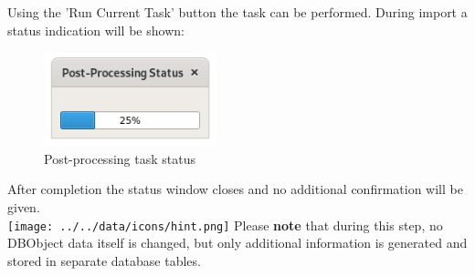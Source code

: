 Using the 'Run Current Task' button the task can be performed. During import a status indication will be shown:

\begin{figure}[H]
  \center
    \includegraphics[width=5cm]{figures/postprocess_status.png}
  \caption{Post-processing task status}
\end{figure}

After completion the status window closes and no additional confirmation will be given. \\

\texttt{[image: ../../data/icons/hint.png]} Please \textbf{note} that during this step, no DBObject data itself is changed, but only additional information is generated and stored in separate database tables.
